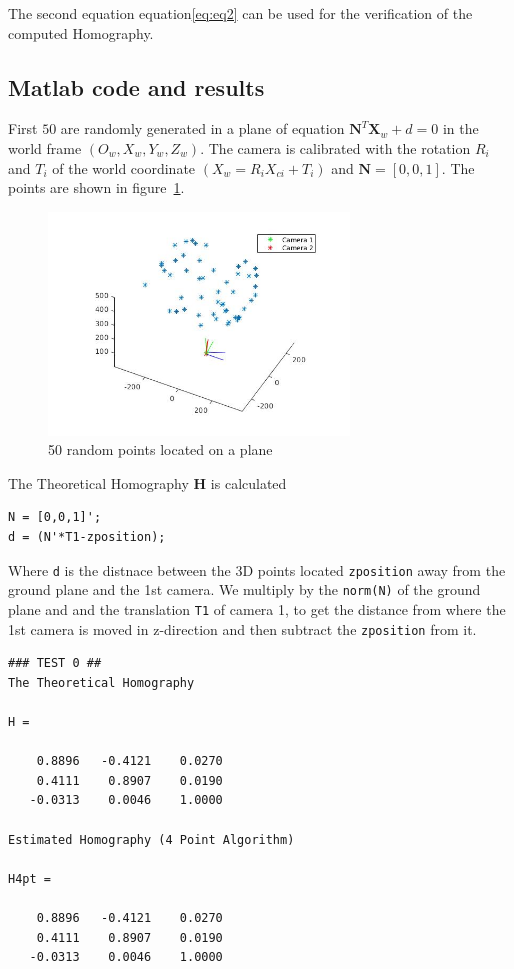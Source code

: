 \documentclass[a4paper,12pt]{article}
\begin{document}
\noindent The second equation equation\eqref{eq:eq2} can be used for the verification of the computed Homography.

\subsection{Matlab code and results}
First $50$ are randomly generated  in a plane of equation
$\mathbf{N}^T \mathbf{X}_w +d = 0$ in the world frame $(O_w , X_w , Y_w , Z_w )$. The camera is calibrated
with the rotation $R_i$ and $T_i$ of the world coordinate $(X_w = R_i X_{ci} + T_i )$ and  $\mathbf{N} = \left[0,0,1\right]$. The points are shown in figure~\ref{fig:points}.

\begin{figure}[tb]
         \centering
         \includegraphics[width=8cm]{Images/points3D.png}
         \caption{50 random points located on a plane}
 	\label{fig:points}
\end{figure}

\vspace*{8pt}
\noindent The Theoretical Homography $\mathbf{H}$ is calculated 
\begin{lstlisting}[style=My-Matlab]
N = [0,0,1]';
d = (N'*T1-zposition); 
\end{lstlisting}
Where \texttt{d} is the distnace between the 3D points located \texttt{zposition} away from the  ground plane and the 1st camera. We multiply by the  \texttt{norm(N)}  of the ground plane and  and the translation \texttt{T1} of camera 1, to get the distance from where the 1st camera is 
 moved in z-direction and then subtract the \texttt{zposition} from it.

\begin{verbatim}
### TEST 0 ##
The Theoretical Homography

H =

    0.8896   -0.4121    0.0270
    0.4111    0.8907    0.0190
   -0.0313    0.0046    1.0000

Estimated Homography (4 Point Algorithm)

H4pt =

    0.8896   -0.4121    0.0270
    0.4111    0.8907    0.0190
   -0.0313    0.0046    1.0000

  
\end{verbatim}
\end{document}
